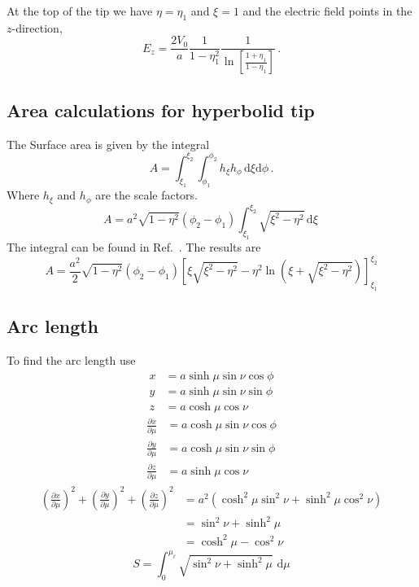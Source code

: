 \documentclass[a4paper,10pt]{article}
\newcommand{\ud}{\mathrm{d}}
\begin{document}
  At the top of the tip we have \(\eta = \eta_1\) and \(\xi = 1\) and the electric field points in the \(z\)-direction,
  \begin{equation}
    E_z = \frac{2V_0}{a} \frac{1}{1 - \eta_1^2} \frac{1}{\ln \left[ \frac{1+\eta_1}{1-\eta_1} \right]}\, .
  \end{equation}
%
\subsection{Area calculations for hyperbolid tip}
  The Surface area is given by the integral
  \begin{equation}
    A = \int_{\xi_1}^{\xi_2} \int_{\phi_1}^{\phi_2} h_{\xi} h_{\phi}\, \ud\xi \ud\phi\, .
  \end{equation}
  Where \(h_{\xi}\) and \(h_{\phi}\) are the scale factors.
  \begin{equation}
    A = a^2 \sqrt{1 - \eta^2} (\phi_2 - \phi_1) \int_{\xi_1}^{\xi_2} \sqrt{\xi^2 - \eta^2}\, \ud\xi\,
  \end{equation}
  The integral can be found in Ref.~\parencite[eq. 2.271-3]{ryshik2000table}. The results are
  \begin{equation}
    A = \frac{a^2}{2} \sqrt{1-\eta^2} (\phi_2 - \phi_1) \left[ \xi \sqrt{\xi^2 - \eta^2} - \eta^2 \ln\left(\xi + \sqrt{\xi^2 - \eta^2}\right) \right]_{\xi_1}^{\xi_2}
  \end{equation}
%
\subsection{Arc length}
  To find the arc length use
  \begin{equation}\begin{split}
    x &= a \sinh{\mu}\sin{\nu}\cos{\phi}\\
    y &= a \sinh{\mu}\sin{\nu}\sin{\phi}\\
    z &= a \cosh{\mu}\cos{\nu}
  \end{split}\end{equation}
%
  \begin{equation}\begin{split}
    \frac{\partial x}{\partial \mu} &= a \cosh{\mu}\sin{\nu}\cos{\phi}\\
    \frac{\partial y}{\partial \mu} &= a \cosh{\mu}\sin{\nu}\sin{\phi}\\
    \frac{\partial z}{\partial \mu} &= a \sinh{\mu}\cos{\nu}
  \end{split}\end{equation}
%
  \begin{equation}\begin{split}
   \left( \frac{\partial x}{\partial \mu} \right)^2 + \left( \frac{\partial y}{\partial \mu} \right)^2  + \left( \frac{\partial z}{\partial \mu} \right)^2
     &= a^2 \left( \cosh^2{\mu}\sin^2{\nu} + \sinh^2{\mu}\cos^2{\nu} \right)\\
     &= \sin^2{\nu} + \sinh^2{\mu}\\
     &= \cosh^2{\mu} - \cos^2{\nu}
   \end{split}\end{equation}
%
  \begin{equation}
    S = \int_0^{\mu_\ell} \sqrt{\sin^2{\nu} + \sinh^2{\mu}}\,\, \ud\mu
  \end{equation}
%
\end{document}
